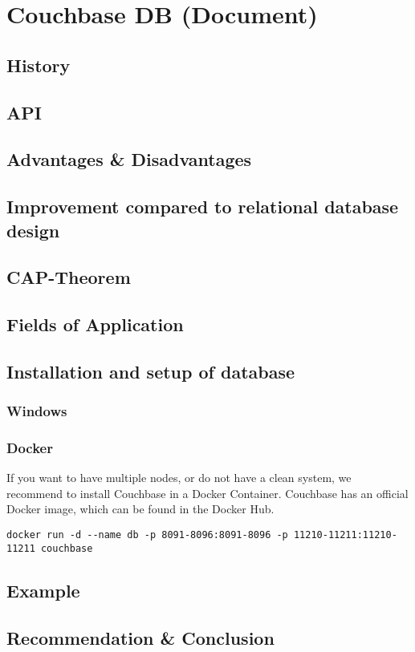 
\chapter{Couchbase DB (Document)} \label{ch:couchbase}

\section{History}

\section{API}

\section{Advantages \& Disadvantages}

\section{Improvement compared to relational database design}

\section{\ac{CAP}-Theorem}

\section{Fields of Application}

\section{Installation and setup of database}

\subsection{Windows}


\subsection{Docker}
If you want to have multiple nodes, or do not have a clean system, we recommend to install Couchbase in a Docker Container. Couchbase has an official Docker image, which can be found in the Docker Hub.

\begin{lstlisting}
docker run -d --name db -p 8091-8096:8091-8096 -p 11210-11211:11210-11211 couchbase
\end{lstlisting}


\section{Example}

\section{Recommendation \& Conclusion}